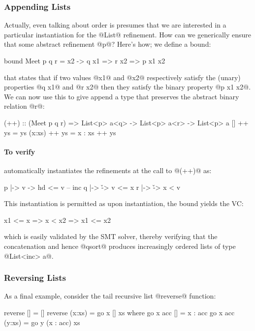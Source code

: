 \subsubsection*{Appending Lists}

Actually, even talking about order is presumes that we are interested
in a particular instantiation for the @List@ refinement. How can we
generically ensure that some abstract refinement @p@? Here's how; we 
define a bound:
%
\begin{code}
    bound Meet p q r =  x2 -> 
      q x1 => r x2 => p x1 x2
\end{code}
%
that states that if two values @x1@ and @x2@ respectively satisfy 
the (unary) properties @q x1@ and @r x2@ then they satisfy the 
binary property @p x1 x2@. We can now use this to give append a 
type that preserves the abstract binary relation @r@:
%
\begin{code}
(++) :: (Meet p q r) => 
          List<p> a<q> -> List<p> a<r> -> List<p> a
[]     ++ ys = ys
(x:xs) ++ ys = x : xs ++ ys
\end{code}

\paragraph{To verify } \toolname automatically instantiates the 
refinements at the call to @(++)@ as: 
%
\begin{code}
    p |-> \hd v -> hd <= v      -- inc 
    q |-> \v -> v <= x 
    r |-> \v -> x < v 
\end{code}
%
This instantiation is permitted as upon instantiation, the bound 
yields the VC:
%
\begin{code}
    x1 <= x => x < x2 => x1 <= x2
\end{code}
%
which is easily validated by the SMT solver, thereby verifying that
the concatenation and hence @qsort@ produces increasingly ordered 
lists of type @List<inc> a@.

\subsubsection*{Reversing Lists}

As a final example, consider the tail recursive list @reverse@ function:
%
\begin{code}
reverse []          = []
reverse (x:xs)      = go x [] xs
  where
    go x acc []     = x : acc
    go x acc (y:xs) = go y (x : acc) xs
\end{code}  

